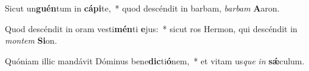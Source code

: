 \item Sicut un\textbf{guén}tum in \textbf{cá}\textbf{pi}te,~* quod descéndit in barbam, \textit{bar}\textit{bam} \textbf{A}aron.
\item Quod descéndit in oram vesti\textbf{mén}ti \textbf{e}jus:~* sicut ros Hermon, qui descéndit in \textit{mon}\textit{tem} \textbf{Si}on.
\item Quóniam illic mandávit Dóminus bene\textbf{dic}ti\textbf{ó}nem,~* et vitam us\textit{que} \textit{in} \textbf{sǽ}culum.
